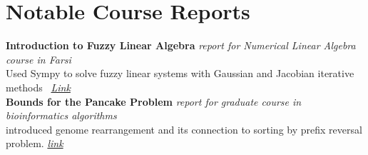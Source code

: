 


\section{Notable Course Reports} 

\textbf{Introduction to Fuzzy Linear Algebra} \textit{report for Numerical Linear Algebra course in Farsi} \\ Used Sympy to solve fuzzy linear systems with Gaussian and Jacobian iterative methods \ \hfill\textit{\href{https://github.com/mehrdad3301/fuzzy-linear-algebra/blob/main/main.pdf}{Link}} \\ 

\textbf{Bounds for the Pancake Problem} \textit{report for graduate course in bioinformatics algorithms} \\ introduced genome rearrangement and its connection to sorting by prefix reversal problem.
\hfill\textit{\href{https://github.com/mehrdad3301/pancake-bounds/blob/main/pancakes.pdf}{link}} 
